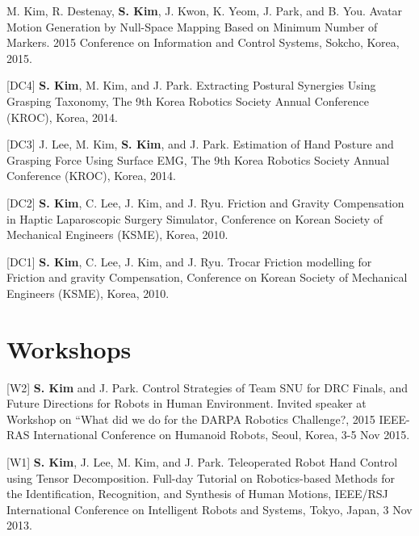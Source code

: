 \documentclass[margin,line]{res}
\begin{document}
\begin{resume}
[DC5] M. Kim, R. Destenay, \textbf{S. Kim}, J. Kwon, K. Yeom, {J. Park}, and B. You.
Avatar Motion Generation by Null-Space Mapping Based on Minimum Number of Markers.
2015 Conference on Information and Control Systems,
Sokcho, Korea, 2015.

[DC4] \textbf{S. Kim}, M. Kim, and J. Park.
Extracting Postural Synergies Using Grasping Taxonomy, 
The 9th Korea Robotics Society Annual Conference (KROC), Korea, 2014.

[DC3] J. Lee, M. Kim, \textbf{S. Kim}, and J. Park.
Estimation of Hand Posture and Grasping Force Using Surface EMG, 
The 9th Korea Robotics Society Annual Conference (KROC), Korea, 2014.

[DC2] \textbf{S. Kim}, C. Lee, J. Kim, and J. Ryu.
Friction and Gravity Compensation in Haptic Laparoscopic Surgery Simulator,
Conference on Korean Society of Mechanical Engineers (KSME), Korea, 2010.


[DC1] \textbf{S. Kim}, C. Lee, J. Kim, and J. Ryu.
Trocar Friction modelling for Friction and gravity Compensation,
Conference on Korean Society of Mechanical Engineers (KSME), Korea, 2010.

\section{\sc Workshops}
[W2] \textbf{S. Kim} and {J. Park}.
Control Strategies of Team SNU for DRC Finals, and Future Directions for Robots in Human Environment.
Invited speaker at Workshop on “What did we do for the DARPA Robotics Challenge?, 
2015 IEEE-RAS International Conference on Humanoid Robots,
Seoul, Korea, 3-5 Nov 2015.

[W1] \textbf{S. Kim}, J. Lee, M. Kim, and {J. Park}.
Teleoperated Robot Hand Control using Tensor Decomposition.
Full-day Tutorial on Robotics-based Methods for the Identification, Recognition, and Synthesis of Human Motions,
IEEE/RSJ International Conference on Intelligent Robots and Systems, 
Tokyo, Japan, 3 Nov 2013.

%


\end{resume}
\end{document}
